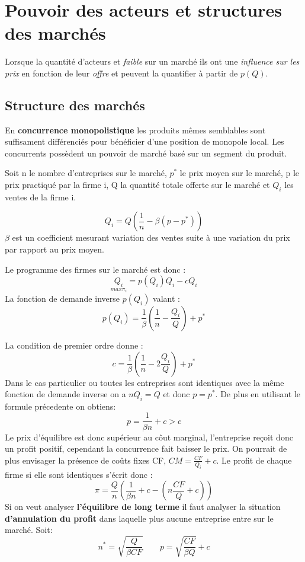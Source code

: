 

\section{Pouvoir des acteurs et structures des marchés} %
\label{sec:pouvoir_des_acteurs_et_structures_des_marches}

Lorsque la quantité d'acteurs et \emph{faible} sur un marché ils ont une \emph{influence sur les prix} en fonction de leur \emph{offre} et peuvent la quantifier à partir de $p(Q)$.

\subsection{Structure des marchés} %
\label{sub:structure_des_marches}

En \textbf{concurrence monopolistique} les produits mêmes semblables sont suffisament différenciés pour bénéficier d'une position de monopole local. Les concurrents possèdent un pouvoir de marché basé sur un segment du produit.
\begin{tcolorbox}[title=Concurrence monopolistique]

Soit n le nombre d'entreprises sur le marché, $p^*$ le prix moyen sur le marché, p le prix practiqué par la firme i, Q la quantité totale offerte sur le marché et $Q_i$ les ventes de la firme i.

\[
	Q_i= Q\left(\frac{1}{n}-\beta (p-p^*)\right)
\]
$\beta$ est un coefficient mesurant variation des ventes suite à une variation du prix par rapport au prix moyen.

Le programme des firmes sur le marché est donc :
\[
	\underset{max \pi_i}{Q_i}= p(Q_i)Q_i-cQ_i
\]
La fonction de demande inverse $p(Q_i)$ valant : 
\[
	p(Q_i)= \frac{1}{\beta}\left(\frac{1}{n}-\frac{Q_i}{Q}\right)+p^*
\]

La condition de premier ordre donne : 
\[
	c= \frac{1}{\beta}\left(\frac{1}{n}-2\frac{Q_i}{Q}\right)+p^*
\]
Dans le cas particulier ou toutes les entreprises sont identiques avec la même fonction de demande inverse on a $nQ_i=Q$ et donc $p=p^*$. De plus en utilisant le formule précedente on obtiens:
\[
	p=\frac{1}{\beta n}+c >c 
\]
Le prix d'équilibre est donc supérieur au côut marginal, l'entreprise reçoit donc un profit positif, cependant la concurrence fait baisser le prix. On pourrait de plus envisager la présence de coûts fixes CF, $CM=\frac{CF}{Q_i}+c$. Le profit de chaque firme si elle sont identiques s'écrit donc :
\[
	\pi = \frac{Q}{n} \left( \frac{1}{\beta n}+c- \left( n\frac{CF}{Q}+c \right) \right)
\]
Si on veut analyser \textbf{l'équilibre de long terme} il faut analyser la situation \textbf{d'annulation du profit} dans laquelle plus aucune entreprise entre sur le marché. Soit:
\[
	n^* = \sqrt{\frac{Q}{\beta CF}} \qquad p=\sqrt{\frac{CF}{\beta Q}}+c
\]
\end{tcolorbox}

